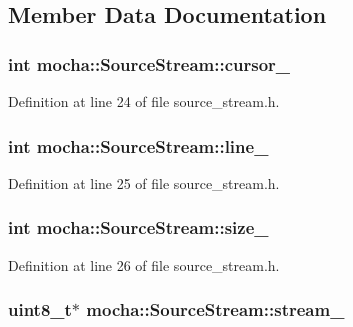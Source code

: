 \subsection{Member Data Documentation}
\hypertarget{classmocha_1_1_source_stream_a1f8d569a431ac46ab8c151022f24a9b1}{
\subsubsection[{cursor\_\-}]{\setlength{\rightskip}{0pt plus 5cm}int {\bf mocha::SourceStream::cursor\_\-}}}
\label{classmocha_1_1_source_stream_a1f8d569a431ac46ab8c151022f24a9b1}


Definition at line 24 of file source\_\-stream.h.

\hypertarget{classmocha_1_1_source_stream_ae2b4ac025bc7fd6afd68b9a6f373609d}{
\subsubsection[{line\_\-}]{\setlength{\rightskip}{0pt plus 5cm}int {\bf mocha::SourceStream::line\_\-}}}
\label{classmocha_1_1_source_stream_ae2b4ac025bc7fd6afd68b9a6f373609d}


Definition at line 25 of file source\_\-stream.h.

\hypertarget{classmocha_1_1_source_stream_a22cc46cbc79457e30b3bdd7f11fb1130}{
\subsubsection[{size\_\-}]{\setlength{\rightskip}{0pt plus 5cm}int {\bf mocha::SourceStream::size\_\-}}}
\label{classmocha_1_1_source_stream_a22cc46cbc79457e30b3bdd7f11fb1130}


Definition at line 26 of file source\_\-stream.h.

\hypertarget{classmocha_1_1_source_stream_aedced96615e1c357371f0f174cb95d13}{
\subsubsection[{stream\_\-}]{\setlength{\rightskip}{0pt plus 5cm}uint8\_\-t$\ast$ {\bf mocha::SourceStream::stream\_\-}}}
\label{classmocha_1_1_source_stream_aedced96615e1c357371f0f174cb95d13}



